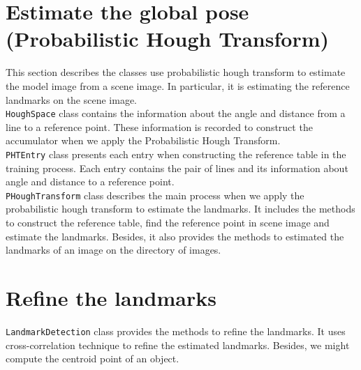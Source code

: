 \section{Estimate the global pose (Probabilistic Hough Transform)}
This section describes the classes use probabilistic hough transform to estimate the model image from a scene image. In particular, it is estimating the reference landmarks on the scene image.\\[0.2cm]
\texttt{HoughSpace} class contains the information about the angle and distance from a line to a reference point. These information is recorded to construct the accumulator when we apply the Probabilistic Hough Transform.\\[0.2cm]
\texttt{PHTEntry} class presents each entry when constructing the reference table in the training process. Each entry contains the pair of lines and its information about angle and distance to a reference point.\\[0.2cm]
\texttt{PHoughTransform} class describes the main process when we apply the probabilistic hough transform to estimate the landmarks. It includes the methods to construct the reference table, find the reference point in scene image and estimate the landmarks. Besides, it also provides the methods to estimated the landmarks of an image on the directory of images.
\section{Refine the landmarks}
\texttt{LandmarkDetection} class provides the methods to refine the landmarks. It uses cross-correlation technique to refine the estimated landmarks. Besides, we might compute the centroid point of an object.